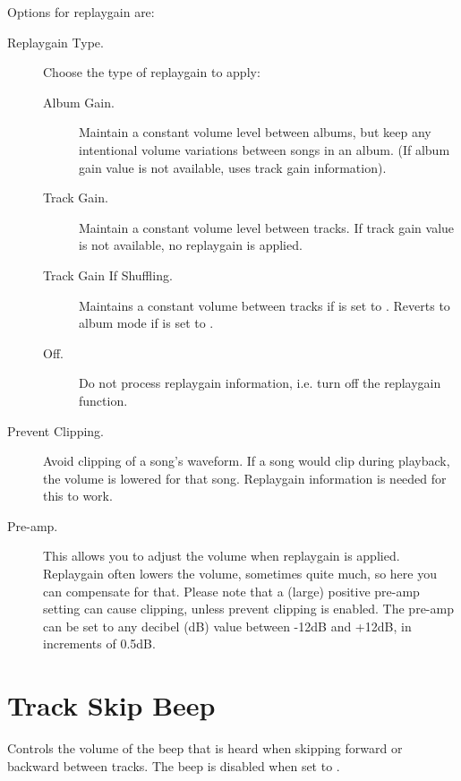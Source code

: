 {    Options for replaygain are:
    \begin{description}
      \item[Replaygain Type.] Choose the type of replaygain to apply:
        \begin{description}
        \item[Album Gain.] Maintain a constant volume level between
          albums, but keep any intentional volume variations between 
          songs in an album. (If album gain value is not available,
          uses track gain information).
        \item[Track Gain.] Maintain a constant volume level between
          tracks. If track gain value is not available, no replaygain 
          is applied.
        \item[Track Gain If Shuffling.] Maintains a constant volume
          between tracks if  is set to .
          Reverts to album mode if  is set to .
        \item[Off.] Do not process replaygain information, i.e. turn off
          the replaygain function.
        \end{description}
      \item[Prevent Clipping.] Avoid clipping of a song's waveform.
        If a song would clip during playback, the volume is lowered for 
        that song. Replaygain information is needed for this to work.
      \item[Pre-amp.] This allows you to adjust the volume when replaygain
        is applied. Replaygain often lowers the volume, sometimes quite
        much, so here you can compensate for that. Please note that a
        (large) positive pre-amp setting can cause clipping, unless
        prevent clipping is enabled.  The pre-amp can be set to any
        decibel (dB) value between -12dB and +12dB, in increments of 0.5{}dB.
      \end{description}

  \section{Track Skip Beep}
    Controls the volume of the beep that is heard when
    skipping forward or backward between tracks. The beep is disabled when
    set to .
}%


